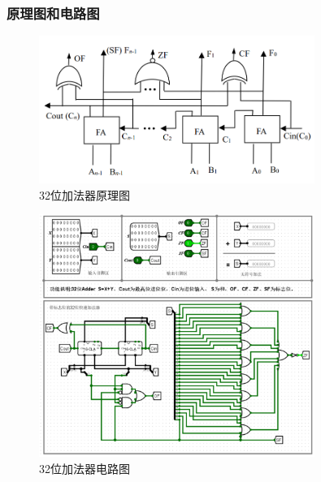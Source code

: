 \documentclass{article}
\begin{document}
    \subsubsection{原理图和电路图}
    \begin{figure}[H]
    \centering
    \includegraphics[width=0.8\textwidth]{4.4.1.png}
    \caption{32位加法器原理图}
    \end{figure}

    \begin{figure}[H]
    \centering
    \includegraphics[width=0.8\textwidth]{4.4.2.png}
    \caption{32位加法器电路图}
    \end{figure}
\end{document}
